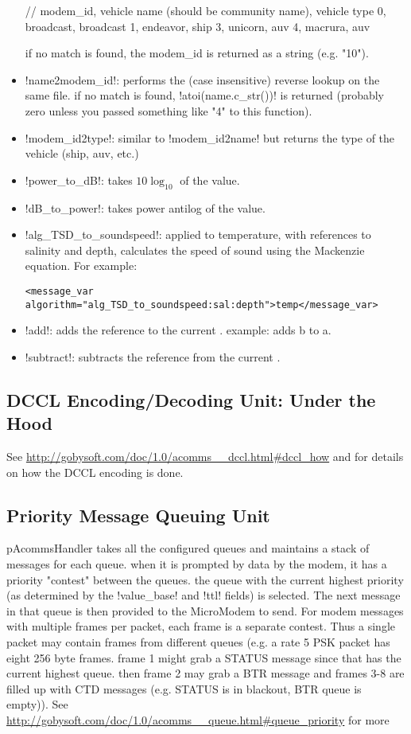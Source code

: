 \begin{itemize}
\begin{boxedverbatim}
// modem_id, vehicle name (should be community name), vehicle type
0, broadcast, broadcast
1, endeavor, ship
3, unicorn, auv
4, macrura, auv
\end{boxedverbatim}
\resetbvlinenumber
if no match is found, the modem\_id is returned as a string (e.g. "10").
\item !name2modem_id!: performs the (case insensitive) reverse lookup on the same file. if no match is found, !atoi(name.c_str())! is returned (probably zero unless you passed something like "4" to this function).
\item !modem_id2type!: similar to !modem_id2name! but returns the type of the vehicle (ship, auv, etc.)
\item !power_to_dB!: takes $10\log_{10}$ of the value.
\item !dB_to_power!: takes power antilog of the value.
\item !alg_TSD_to_soundspeed!: applied to temperature, with references to salinity and depth, calculates the speed of sound using the Mackenzie equation. For example:
\begin{verbatim}<message_var algorithm="alg_TSD_to_soundspeed:sal:depth">temp</message_var>\end{verbatim}
\item !add!: adds the reference  to the current . example:  adds b to a.
\item !subtract!: subtracts the reference  from the current .
\end{itemize}

\subsection{DCCL Encoding/Decoding Unit: Under the Hood}

See \url{http://gobysoft.com/doc/1.0/acomms__dccl.html#dccl_how} and \cite{dccl_oceans10} for details on how the DCCL encoding is done.

\subsection{Priority Message Queuing Unit}

pAcommsHandler takes all the configured queues and maintains a stack of messages for each queue. when it is prompted by data by the modem, it has a priority "contest" between the queues. the queue with the current highest priority (as determined by the !value_base! and !ttl! fields) is selected. The next message in that queue is then provided to the MicroModem to send. For modem messages with multiple frames per packet, each frame is a separate contest. Thus a single packet may contain frames from different
 queues (e.g. a rate 5 PSK packet has eight 256 byte frames. frame 1 might grab a STATUS message since that has the current highest queue. then frame 2 may grab a BTR message and frames 3-8 are filled up with CTD messages (e.g. STATUS is in blackout, BTR queue is empty)). See \url{http://gobysoft.com/doc/1.0/acomms__queue.html#queue_priority} for more


